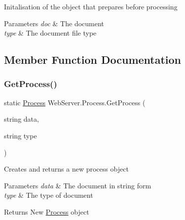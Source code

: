 Initalisation of the object that prepares before processing 


\begin{DoxyParams}{Parameters}
{\em doc} & The document\\
\hline
{\em type} & The document file type\\
\hline
\end{DoxyParams}


\subsection{Member Function Documentation}
\mbox{\label{class_web_server_1_1_process_a8426008d439d0beef6f59c757a2c22eb}} 
\subsubsection{\texorpdfstring{Get\+Process()}{GetProcess()}}
{\footnotesize\ttfamily static \hyperlink{class_web_server_1_1_process}{Process} Web\+Server.\+Process.\+Get\+Process (\begin{DoxyParamCaption}\item[{string}]{data,  }\item[{string}]{type }\end{DoxyParamCaption})\hspace{0.3cm}{\ttfamily [static]}}



Creates and returns a new process object 


\begin{DoxyParams}{Parameters}
{\em data} & The document in string form\\
\hline
{\em type} & The type of document\\
\hline
\end{DoxyParams}
\begin{DoxyReturn}{Returns}
New \hyperlink{class_web_server_1_1_process}{Process} object
\end{DoxyReturn}
\mbox{\label{class_web_server_1_1_process_a3cd5a133e4c79d58f8a5d4c400614986}} 
